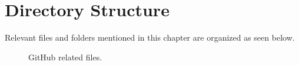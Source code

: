 \section{Directory Structure}

\justifying
Relevant files and folders mentioned in this chapter are organized as seen below.

\begin{figure}[!htb]
      \centering
      
      \caption{GitHub related files.}
      \label{githubfiles}
\end{figure}

